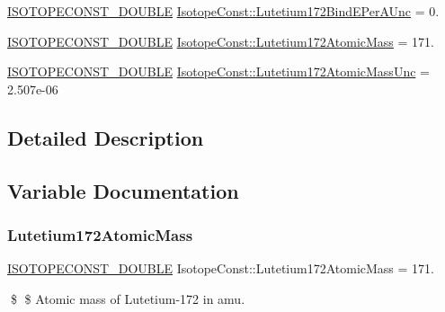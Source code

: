 \begin{DoxyCompactItemize}
\mbox{\hyperlink{group___isotope_const-_macros_ga8f45a7272ce02c0b4c65c44636ed719a}{I\+S\+O\+T\+O\+P\+E\+C\+O\+N\+S\+T\+\_\+\+D\+O\+U\+B\+LE}} \mbox{\hyperlink{group___isotope_const-_lutetium-_lu172_ga6a742e2aff91a5afe8618bac78b8eaf5}{Isotope\+Const\+::\+Lutetium172\+Bind\+E\+Per\+A\+Unc}} = 0.
\item 
\mbox{\hyperlink{group___isotope_const-_macros_ga8f45a7272ce02c0b4c65c44636ed719a}{I\+S\+O\+T\+O\+P\+E\+C\+O\+N\+S\+T\+\_\+\+D\+O\+U\+B\+LE}} \mbox{\hyperlink{group___isotope_const-_lutetium-_lu172_ga40912ee88f3ea4ea819bdb9c533f6b8d}{Isotope\+Const\+::\+Lutetium172\+Atomic\+Mass}} = 171.
\item 
\mbox{\hyperlink{group___isotope_const-_macros_ga8f45a7272ce02c0b4c65c44636ed719a}{I\+S\+O\+T\+O\+P\+E\+C\+O\+N\+S\+T\+\_\+\+D\+O\+U\+B\+LE}} \mbox{\hyperlink{group___isotope_const-_lutetium-_lu172_gabc5fdf536786dcac885f9f27cb7c3eb9}{Isotope\+Const\+::\+Lutetium172\+Atomic\+Mass\+Unc}} = 2.\+507e-\/06
\end{DoxyCompactItemize}


\subsection{Detailed Description}


\subsection{Variable Documentation}
\mbox{\label{group___isotope_const-_lutetium-_lu172_ga40912ee88f3ea4ea819bdb9c533f6b8d}} 
\subsubsection{\texorpdfstring{Lutetium172\+Atomic\+Mass}{Lutetium172AtomicMass}}
{\footnotesize\ttfamily \mbox{\hyperlink{group___isotope_const-_macros_ga8f45a7272ce02c0b4c65c44636ed719a}{I\+S\+O\+T\+O\+P\+E\+C\+O\+N\+S\+T\+\_\+\+D\+O\+U\+B\+LE}} Isotope\+Const\+::\+Lutetium172\+Atomic\+Mass = 171.}

\$ \$ Atomic mass of Lutetium-\/172 in amu. \mbox{\label{group___isotope_const-_lutetium-_lu172_gabc5fdf536786dcac885f9f27cb7c3eb9}} 

